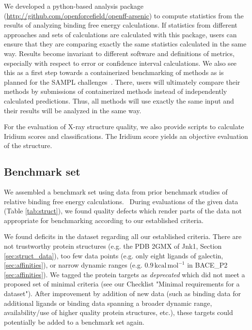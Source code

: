 \documentclass[9pt,bestpractices]{livecoms}
\begin{document}
We developed a python-based analysis package (\url{http://github.com/openforcefield/openff-arsenic}) to compute statistics from the results of analyzing binding free energy calculations. If statistics from different approaches and sets of calculations are calculated with this package, users can ensure that they are comparing exactly the same statistics calculated in the same way. Results become invariant to different software and definitions of metrics, especially with respect to error or confidence interval calculations. We also see this as a first step towards a containerized benchmarking of methods as is planned for the SAMPL challenges~\cite{mobley_sampl_2021}. There, users will ultimately compare their methods by submissions of containerized methods instead of independently calculated predictions. Thus, all methods will use exactly the same input and their results will be analyzed in the same way. 

For the evaluation of X-ray structure quality, we also provide scripts to calculate Iridium scores and classifications. The Iridium score yields an objective evaluation of the structure.

\subsection{Benchmark set}
\label{sec:benchmark_set}

We assembled a benchmark set using data from prior benchmark studies of relative binding free energy calculations.~\cite{wang_accurate_2015,gapsys_large_2020,schindler_largescale_2020} During evaluations of the given data (Table \ref{tab:struct}), we found quality defects which render parts of the data not appropriate for benchmarking according to our established criteria.

We found deficits in the dataset regarding all our established criteria. There are not trustworthy protein structures (e.g. the PDB 2GMX of Jnk1, Section \ref{sec:struct_data}),
too few data points (e.g. only eight ligands of galectin, \ref{sec:affinities}), or
narrow dynamic ranges (e.g. $0.9\,\mathrm{kcal\,mol^{-1}}$ in BACE\_P2 \ref{sec:affinities}).
% 
We tagged the protein targets as \textit{deprecated} which did not meet a proposed set of minimal criteria (see our Checklist "Minimal requirements for a dataset"). After improvement by addition of new data (such as binding data for additional ligands or binding data spanning a broader dynamic range, availability/use of higher quality protein structures, etc.), these targets could potentially be added to a benchmark set again. 
\end{document}
